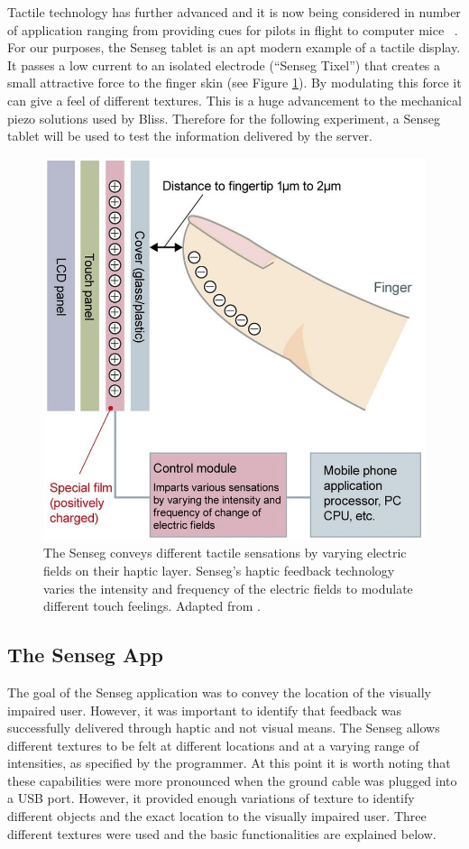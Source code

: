 Tactile technology has further advanced and it is now being considered in number of application ranging from providing cues for pilots in flight \citep{spirkovska2005summary} to computer mice~\citep{akamatsu1996movement} . For our purposes, the Senseg tablet is an apt modern example of a tactile display. It passes a low current to an isolated electrode (``Senseg Tixel'') that creates a small attractive force to the finger skin (see Figure \ref{fig:senseg_tech}). By modulating this force it can give a feel of different textures. This is a huge advancement to the mechanical piezo solutions used by Bliss.  Therefore for the following experiment,  a Senseg tablet will be used to test the information delivered by the server.

\begin{figure}
\centering
\includegraphics[width= .7\linewidth]{gfx/Chapter06/senseg_technology.png}
\caption{The Senseg conveys different tactile sensations by varying electric fields on their haptic layer. Senseg's haptic feedback technology varies the intensity and frequency of the electric fields to modulate different touch feelings. Adapted from \citep{Senseg}.}
\label{fig:senseg_tech}
\end{figure}

\subsection{The Senseg App}
The goal of the Senseg application was to convey the location of the visually impaired user. However, it was important to identify that feedback was successfully delivered through haptic and not visual means. The Senseg allows different textures to be felt at different locations and at a varying range of intensities, as specified by the programmer. At this point it is worth noting that these capabilities were more pronounced when the ground cable was plugged into a USB port. However, it provided enough variations of texture to identify different objects and the exact location to the visually impaired user. Three different textures were used and the basic functionalities are explained below.

